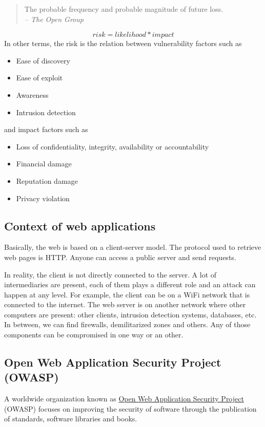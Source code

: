 \begin{quote}
The probable frequency and probable magnitude of future loss.\\
\textit{-- The Open Group}
\end{quote}
\[
   risk = likelihood * impact
\]
In other terms, the risk is the relation between vulnerability factors such as
\begin{itemize}
\item Ease of discovery
\item Ease of exploit
\item Awareness
\item Intrusion detection
\end{itemize}
and impact factors such as
\begin{itemize}
\item Loss of confidentiality, integrity, availability or accountability
\item Financial damage
\item Reputation damage
\item Privacy violation
\end{itemize}

\subsection{Context of web applications}

Basically, the web is based on a client-server model. The protocol used to
retrieve web pages is HTTP. Anyone can access a public server and send
requests.

In reality, the client is not directly connected to the server. A lot of
intermediaries are present, each of them plays a different role and an attack
can happen at any level.
For example, the client can be on a WiFi network that is connected to the
internet. The web server is on another network where other computers are
present: other clients, intrusion detection systems, databases, etc. In
between, we can find firewalls, demilitarized zones and others.
Any of those components can be compromised in one way or an other.

\subsection{Open Web Application Security Project (OWASP)}

A worldwide organization known as \href{https://www.owasp.org/}{Open Web
Application Security Project} (OWASP) focuses on improving the security of
software through the publication of standards, software libraries and books.

